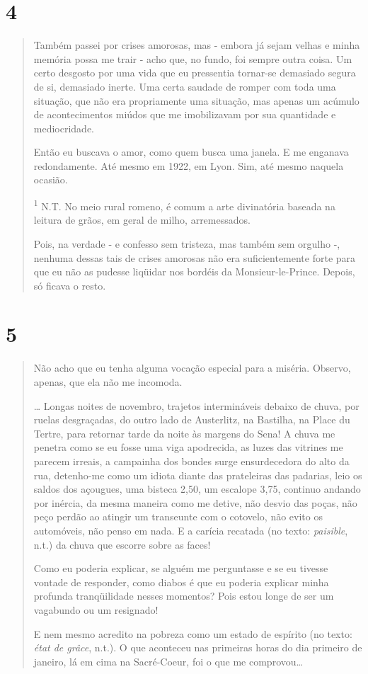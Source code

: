 \section{4}\label{section-3}

\begin{quote}
Também passei por crises amorosas, mas - embora já sejam velhas e minha
memória possa me trair - acho que, no fundo, foi sempre outra coisa. Um
certo desgosto por uma vida que eu pressentia tornar-se demasiado segura
de si, demasiado inerte. Uma certa saudade de romper com toda uma
situação, que não era propriamente uma situação, mas apenas um acúmulo
de acontecimentos miúdos que me imobilizavam por sua quantidade e
mediocridade.

Então eu buscava o amor, como quem busca uma janela. E me enganava
redondamente. Até mesmo em 1922, em Lyon. Sim, até mesmo naquela
ocasião.

\textsuperscript{1} \protect\hypertarget{_bookmark0}{}{}N.T. No meio
rural romeno, é comum a arte divinatória baseada na leitura de grãos, em
geral de milho, arremessados.

Pois, na verdade - e confesso sem tristeza, mas também sem orgulho -,
nenhuma dessas tais de crises amorosas não era suficientemente forte
para que eu não as pudesse liqüidar nos bordéis da Monsieur-le-Prince.
Depois, só ficava o resto.
\end{quote}

\section{5}\label{section-4}

\begin{quote}
Não acho que eu tenha alguma vocação especial para a miséria. Observo,
apenas, que ela não me incomoda.

\ldots{} Longas noites de novembro, trajetos intermináveis debaixo de
chuva, por ruelas desgraçadas, do outro lado de Austerlitz, na Bastilha,
na Place du Tertre, para retornar tarde da noite às margens do Sena! A
chuva me penetra como se eu fosse uma viga apodrecida, as luzes das
vitrines me parecem irreais, a campainha dos bondes surge ensurdecedora
do alto da rua, detenho-me como um idiota diante das prateleiras das
padarias, leio os saldos dos açougues, uma bisteca 2,50, um escalope
3,75, continuo andando por inércia, da mesma maneira como me detive, não
desvio das poças, não peço perdão ao atingir um transeunte com o
cotovelo, não evito os automóveis, não penso em nada. E a carícia
recatada (no texto: \emph{paisible}, n.t.) da chuva que escorre sobre as
faces!

Como eu poderia explicar, se alguém me perguntasse e se eu tivesse
vontade de responder, como diabos é que eu poderia explicar minha
profunda tranqüilidade nesses momentos? Pois estou longe de ser um
vagabundo ou um resignado!

E nem mesmo acredito na pobreza como um estado de espírito (no texto:
\emph{état de grâce}, n.t.). O que aconteceu nas primeiras horas do dia
primeiro de janeiro, lá em cima na Sacré-Coeur, foi o que me
comprovou\ldots{}
\end{quote}

